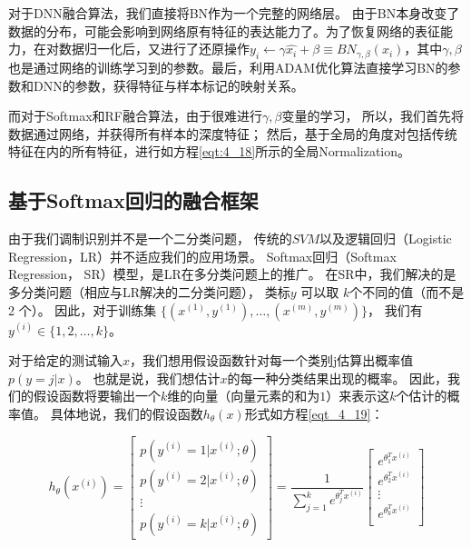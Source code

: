 对于DNN融合算法，我们直接将BN作为一个完整的网络层。
由于BN本身改变了数据的分布，可能会影响到网络原有特征的表达能力了。为了恢复网络的表征能力，在对数据归一化后，又进行了还原操作$y_i \leftarrow \gamma \hat{x_i} + \beta \equiv BN_{\gamma, \beta}(x_i)$，其中$\gamma, \beta$也是通过网络的训练学习到的参数。最后，利用ADAM优化算法直接学习BN的参数和DNN的参数，获得特征与样本标记的映射关系。\par

而对于Softmax和RF融合算法，由于很难进行$\gamma, \beta$变量的学习，
所以，我们首先将数据通过网络，并获得所有样本的深度特征；
然后，基于全局的角度对包括传统特征在内的所有特征，进行如方程\eqref{eqt:4_18}所示的全局Normalization。\par

\subsection{基于Softmax回归的融合框架}

由于我们调制识别并不是一个二分类问题，
传统的$SVM$以及逻辑回归（Logistic Regression，LR）并不适应我们的应用场景。
Softmax回归（Softmax Regression， SR）模型，是LR在多分类问题上的推广。
在SR中，我们解决的是多分类问题（相应与LR解决的二分类问题），
类标$y$ 可以取 $k$个不同的值（而不是 2 个）。
因此，对于训练集 $\{ (x^{(1)}, y^{(1)}), \dots, (x^{(m)}, y^{(m)}) \}$，
我们有$y^{(i)} \in \{1, 2, \dots, k\}$。\par

对于给定的测试输入$x$，我们想用假设函数针对每一个类别j估算出概率值$p(y=j | x)$。
也就是说，我们想估计$x$的每一种分类结果出现的概率。
因此，我们的假设函数将要输出一个$k$维的向量（向量元素的和为$1$）来表示这$k$个估计的概率值。
具体地说，我们的假设函数$h_{\theta}(x)$形式如方程\eqref{eqt_4_19}：

\begin{equation}
\label{eqt_4_19}
		h_\theta(x^{(i)}) =
		\begin{bmatrix}
			p(y^{(i)} = 1 | x^{(i)}; \theta) \\
			p(y^{(i)} = 2 | x^{(i)}; \theta) \\
			\vdots \\
			p(y^{(i)} = k | x^{(i)}; \theta)
		\end{bmatrix}
			=
			\frac{1}{ \sum_{j=1}^{k}{e^{ \theta_j^T x^{(i)} }} }
			\begin{bmatrix}
			e^{ \theta_1^T x^{(i)} } \\
			e^{ \theta_2^T x^{(i)} } \\
			\vdots \\
			e^{ \theta_k^T x^{(i)} } \\
			\end{bmatrix}
\end{equation}

